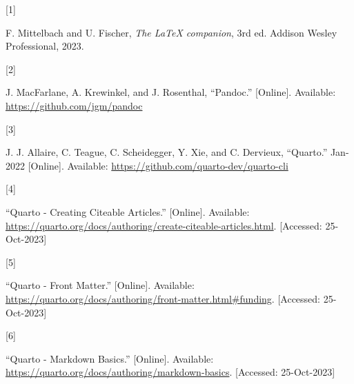 \documentclass[
  journal,
]{IEEEtran}%
\newlength{\cslhangindent}
\newlength{\csllabelwidth}
\newenvironment{CSLReferences}[2] %
 {\begin{list}{}{%
  \setlength{\itemindent}{0pt}
  \setlength{\leftmargin}{0pt}
  \setlength{\parsep}{0pt}
  \ifodd #1
   \setlength{\leftmargin}{\cslhangindent}
   \setlength{\itemindent}{-1\cslhangindent}
  \fi
  \setlength{\itemsep}{#2\baselineskip}}}
 {\end{list}}
\newcommand{\CSLLeftMargin}[1]{\parbox[t]{\csllabelwidth}{\strut#1\strut}}
\newcommand{\CSLRightInline}[1]{\parbox[t]{\linewidth - \csllabelwidth}{\strut#1\strut}}
\theoremstyle{plain}
\theoremstyle{remark}
\providecommand{\bibfont}{\footnotesize}
\begin{document}
\label{refs}
\begin{CSLReferences}{0}{0}
\CSLLeftMargin{{[}1{]} }%
\CSLRightInline{F. Mittelbach and U. Fischer, \emph{The {LaTeX}
companion}, 3rd ed. {Addison Wesley Professional}, 2023. }

\CSLLeftMargin{{[}2{]} }%
\CSLRightInline{J. MacFarlane, A. Krewinkel, and J. Rosenthal,
{``{Pandoc}.''} {[}Online{]}. Available:
\url{https://github.com/jgm/pandoc}}

\CSLLeftMargin{{[}3{]} }%
\CSLRightInline{J. J. Allaire, C. Teague, C. Scheidegger, Y. Xie, and C.
Dervieux, {``{Quarto}.''} Jan-2022 {[}Online{]}. Available:
\url{https://github.com/quarto-dev/quarto-cli}}

\CSLLeftMargin{{[}4{]} }%
\CSLRightInline{{``Quarto - {Creating Citeable Articles}.''}
{[}Online{]}. Available:
\url{https://quarto.org/docs/authoring/create-citeable-articles.html}.
{[}Accessed: 25-Oct-2023{]}}

\CSLLeftMargin{{[}5{]} }%
\CSLRightInline{{``Quarto - {Front Matter}.''} {[}Online{]}. Available:
\url{https://quarto.org/docs/authoring/front-matter.html\#funding}.
{[}Accessed: 25-Oct-2023{]}}

\CSLLeftMargin{{[}6{]} }%
\CSLRightInline{{``Quarto - {Markdown Basics}.''} {[}Online{]}.
Available: \url{https://quarto.org/docs/authoring/markdown-basics}.
{[}Accessed: 25-Oct-2023{]}}

\end{CSLReferences}


\ifCLASSOPTIONcaptionsoff
  \newpage
\fi


\end{document}

